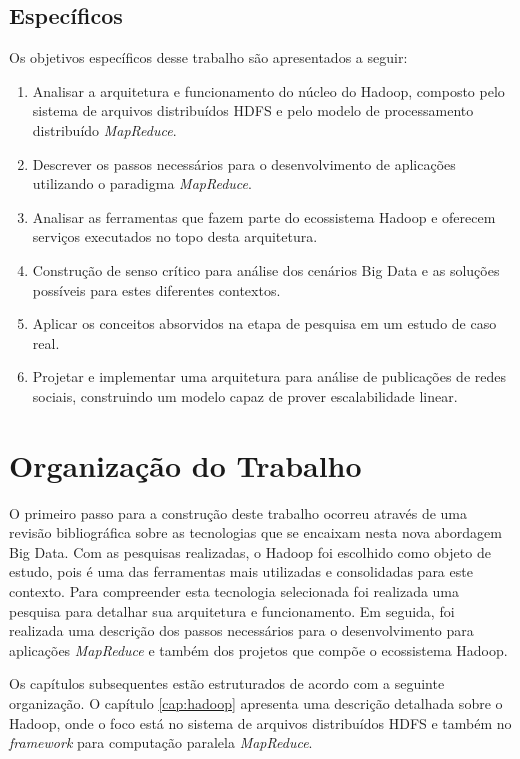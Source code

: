 \subsection{Específicos}
 
Os objetivos específicos desse trabalho são apresentados a seguir:
 
\begin{enumerate}
  \item Analisar a arquitetura e funcionamento do núcleo do Hadoop, composto pelo sistema de arquivos distribuídos HDFS e pelo modelo de processamento distribuído \textit{MapReduce}.
  \item Descrever os passos necessários para o desenvolvimento de aplicações utilizando o paradigma \textit{MapReduce}.
  \item Analisar as ferramentas que fazem parte do ecossistema Hadoop e oferecem serviços executados no topo desta arquitetura.
  \item Construção de senso crítico para análise dos cenários Big Data e as soluções possíveis para estes diferentes contextos.
  \item Aplicar os conceitos absorvidos na etapa de pesquisa em um estudo de caso real.
  \item Projetar e implementar uma arquitetura para análise de publicações de redes sociais, construindo um modelo capaz de prover escalabilidade linear.

\end{enumerate}
 
 
\section{Organização do Trabalho}
 
O primeiro passo para a construção deste trabalho ocorreu através de uma revisão bibliográfica sobre as tecnologias que se encaixam nesta nova abordagem Big Data. Com as pesquisas realizadas, o Hadoop foi escolhido como objeto de estudo, pois é uma das ferramentas mais utilizadas e consolidadas para este contexto. Para compreender esta tecnologia selecionada foi realizada uma pesquisa para detalhar sua arquitetura e funcionamento. Em seguida, foi realizada uma descrição dos passos necessários para o desenvolvimento para aplicações \textit{MapReduce} e também dos projetos que compõe o ecossistema Hadoop.

Os capítulos subsequentes estão estruturados de acordo com a seguinte organização. O capítulo \ref{cap:hadoop} apresenta uma descrição detalhada sobre o Hadoop, onde o foco está no sistema de arquivos distribuídos HDFS e também no \textit{framework} para computação paralela \textit{MapReduce}. 

